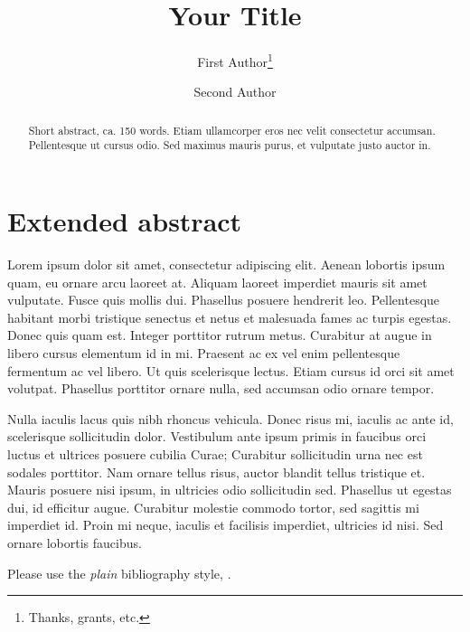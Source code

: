 \documentclass{llncs}
\begin{document}
\title{Your Title}
\author{First Author\thanks{Thanks, grants, etc.} \and Second Author}
%
%

\maketitle              

\begin{abstract}
Short abstract, ca. 150 words. Etiam ullamcorper eros nec velit consectetur accumsan. Pellentesque ut cursus odio. Sed maximus mauris purus, et vulputate justo auctor in.
\end{abstract}
%
\section{Extended abstract}
%
 Lorem ipsum dolor sit amet, consectetur adipiscing elit. Aenean lobortis ipsum quam, eu ornare arcu laoreet at. Aliquam laoreet imperdiet mauris sit amet vulputate. Fusce quis mollis dui. Phasellus posuere hendrerit leo. Pellentesque habitant morbi tristique senectus et netus et malesuada fames ac turpis egestas. Donec quis quam est. Integer porttitor rutrum metus. Curabitur at augue in libero cursus elementum id in mi. Praesent ac ex vel enim pellentesque fermentum ac vel libero. Ut quis scelerisque lectus. Etiam cursus id orci sit amet volutpat. Phasellus porttitor ornare nulla, sed accumsan odio ornare tempor.

Nulla iaculis lacus quis nibh rhoncus vehicula. Donec risus mi, iaculis ac ante id, scelerisque sollicitudin dolor. Vestibulum ante ipsum primis in faucibus orci luctus et ultrices posuere cubilia Curae; Curabitur sollicitudin urna nec est sodales porttitor. Nam ornare tellus risus, auctor blandit tellus tristique et. Mauris posuere nisi ipsum, in ultricies odio sollicitudin sed. Phasellus ut egestas dui, id efficitur augue. Curabitur molestie commodo tortor, sed sagittis mi imperdiet id. Proin mi neque, iaculis et facilisis imperdiet, ultricies id nisi. Sed ornare lobortis faucibus.

Please use the \textit{plain} bibliography style, \cite{book-minimal}.


\end{document}
